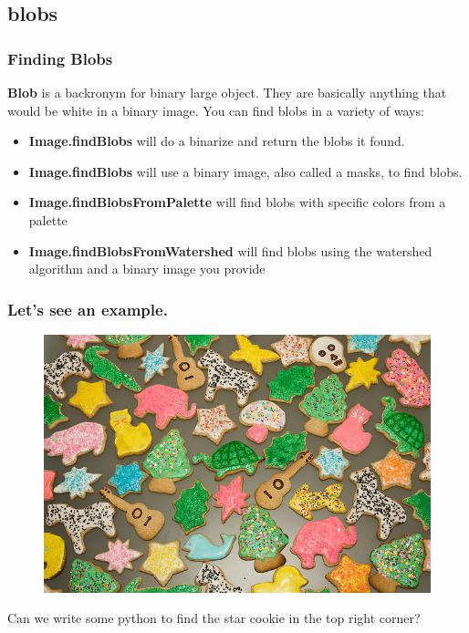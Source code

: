 \documentclass{beamer}
\begin{document}
\subsection{blobs}
\begin{frame}
  \frametitle{Finding Blobs}

\textbf{Blob} is a backronym for binary large object. They are
basically anything that would be white in a binary image. You can find
blobs in a variety of ways:
\begin{itemize}
\item \textbf{Image.findBlobs} will do a binarize and return the blobs
  it found.
\item \textbf{Image.findBlobs} will use a binary image, also called a
  masks, to find blobs.
\item \textbf{Image.findBlobsFromPalette} will find blobs with
  specific colors from a palette
\item \textbf{Image.findBlobsFromWatershed} will find blobs using the
  watershed algorithm and a binary image you provide
\end{itemize}
\end{frame}
\begin{frame}
  \frametitle{Let's see an example.}
 \begin{figure}
     \includegraphics[width=0.7\linewidth]{cookies.jpg}
 \end{figure}
Can we write some python to find the star cookie in the top right corner?
\end{frame}
\end{document}

